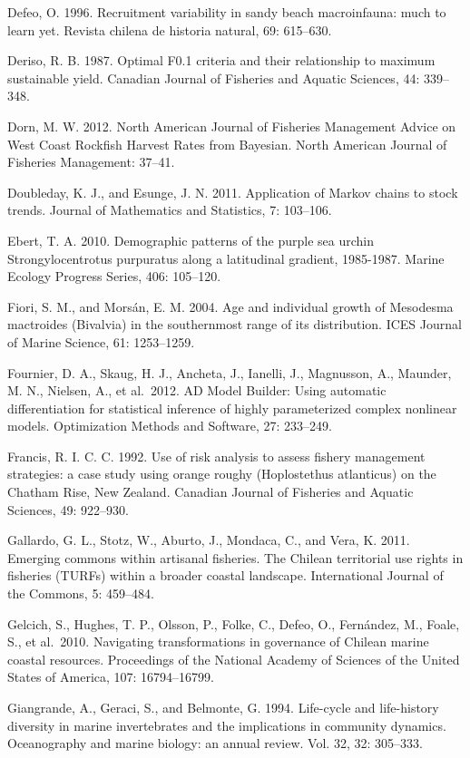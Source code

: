 \documentclass[12pt]{article}
\begin{document}
Defeo, O. 1996. Recruitment variability in sandy beach macroinfauna:
much to learn yet. Revista chilena de historia natural, 69: 615--630.

Deriso, R. B. 1987. Optimal F0.1 criteria and their relationship to
maximum sustainable yield. Canadian Journal of Fisheries and Aquatic
Sciences, 44: 339--348.

Dorn, M. W. 2012. North American Journal of Fisheries Management Advice
on West Coast Rockfish Harvest Rates from Bayesian. North American
Journal of Fisheries Management: 37--41.

Doubleday, K. J., and Esunge, J. N. 2011. Application of Markov chains
to stock trends. Journal of Mathematics and Statistics, 7: 103--106.

Ebert, T. A. 2010. Demographic patterns of the purple sea urchin
Strongylocentrotus purpuratus along a latitudinal gradient, 1985-1987.
Marine Ecology Progress Series, 406: 105--120.

Fiori, S. M., and Morsán, E. M. 2004. Age and individual growth of
Mesodesma mactroides (Bivalvia) in the southernmost range of its
distribution. ICES Journal of Marine Science, 61: 1253--1259.

Fournier, D. A., Skaug, H. J., Ancheta, J., Ianelli, J., Magnusson, A.,
Maunder, M. N., Nielsen, A., et al.~2012. AD Model Builder: Using
automatic differentiation for statistical inference of highly
parameterized complex nonlinear models. Optimization Methods and
Software, 27: 233--249.

Francis, R. I. C. C. 1992. Use of risk analysis to assess fishery
management strategies: a case study using orange roughy (Hoplostethus
atlanticus) on the Chatham Rise, New Zealand. Canadian Journal of
Fisheries and Aquatic Sciences, 49: 922--930.

Gallardo, G. L., Stotz, W., Aburto, J., Mondaca, C., and Vera, K. 2011.
Emerging commons within artisanal fisheries. The Chilean territorial use
rights in fisheries (TURFs) within a broader coastal landscape.
International Journal of the Commons, 5: 459--484.

Gelcich, S., Hughes, T. P., Olsson, P., Folke, C., Defeo, O., Fernández,
M., Foale, S., et al.~2010. Navigating transformations in governance of
Chilean marine coastal resources. Proceedings of the National Academy of
Sciences of the United States of America, 107: 16794--16799.

Giangrande, A., Geraci, S., and Belmonte, G. 1994. Life-cycle and
life-history diversity in marine invertebrates and the implications in
community dynamics. Oceanography and marine biology: an annual review.
Vol. 32, 32: 305--333.
\end{document}
